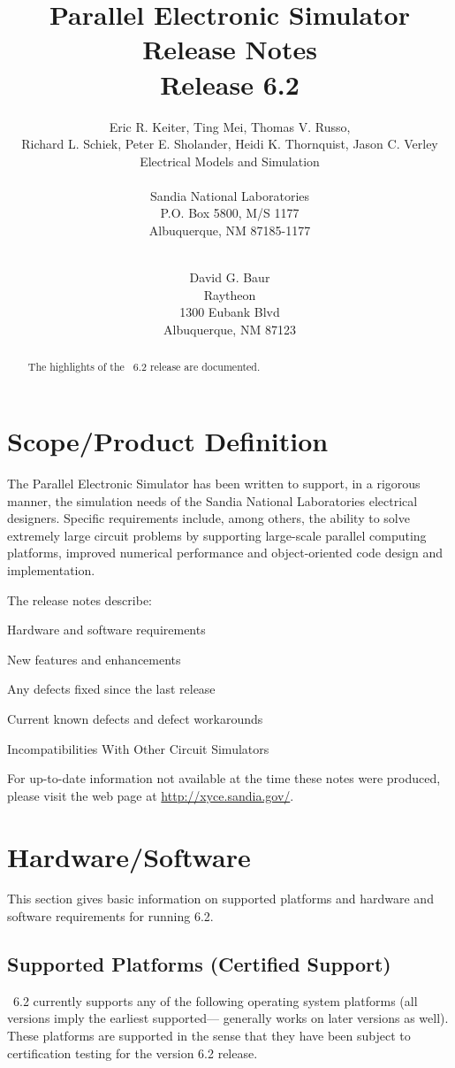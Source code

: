 \documentclass[11pt,report,strict]{SANDreport}
\title{\XyceTitle{} Parallel Electronic Simulator Release Notes\\Release 6.2}
\date{}
\author{Eric R. Keiter, 
            Ting Mei, 
            Thomas V. Russo, \\
            Richard L. Schiek, 
            Peter E. Sholander,
            Heidi K. Thornquist,
            Jason C. Verley\\
            Electrical Models and Simulation \\[1ex]
\\
            Sandia National Laboratories\\
            P.O. Box 5800, M/S 1177\\
            Albuquerque, NM 87185-1177 \\
\\
\and 
David G. Baur\\
  Raytheon\\
  1300 Eubank Blvd\\
  Albuquerque, NM 87123 \\
}
\begin{document}
\maketitle
\begin{abstract}
  The highlights of the \XyceTM\ 6.2 release are documented.
\end{abstract}
\cleardoublepage
\tableofcontents


%
\SANDmain		%
\section{Scope/Product Definition}

The \Xyce{} Parallel Electronic Simulator has been written to support, in a
rigorous manner, the simulation needs of the Sandia National Laboratories
electrical designers.  Specific requirements include, among others, the
ability to solve extremely large circuit problems by supporting large-scale
parallel computing platforms, improved numerical performance and
object-oriented code design and implementation.

The \Xyce{} release notes describe:
\begin{XyceItemize}
  \item Hardware and software requirements
  \item New features and enhancements
  \item Any defects fixed since the last release
  \item Current known defects and defect workarounds
  \item Incompatibilities With Other Circuit Simulators
\end{XyceItemize}

For up-to-date information not available at the time these notes 
were produced, please visit the \Xyce{} web page at 
{\color{XyceDeepRed}\url{http://xyce.sandia.gov/}}.


\section{Hardware/Software}
This section gives basic information on supported platforms and hardware
and software requirements for running \Xyce{} 6.2.

\subsection{Supported Platforms (Certified Support)}
\Xyce\ 6.2 currently supports any of the following operating system platforms
(all versions imply the earliest supported---\Xyce{} generally works on later
versions as well).  These platforms are supported in the sense that they have
been subject to certification testing for the \Xyce{} version 6.2 release.  
\end{document}
